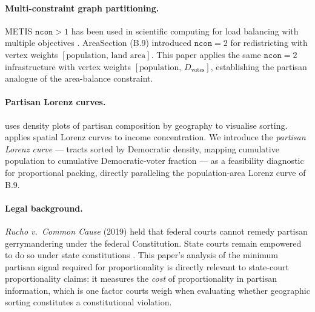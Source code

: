 \paragraph{Multi-constraint graph partitioning.}
METIS $\mathtt{ncon} > 1$ has been used in scientific computing for load
balancing with multiple objectives \citep{karypis1999metis}.
AreaSection (B.9) introduced $\mathtt{ncon}=2$ for redistricting with vertex
weights $[\text{population},\, \text{land area}]$.
This paper applies the same $\mathtt{ncon}=2$ infrastructure with vertex
weights $[\text{population},\, D_{\text{votes}}]$, establishing the partisan
analogue of the area-balance constraint.

\paragraph{Partisan Lorenz curves.}
\citet{rodden2019} uses density plots of partisan composition by geography to
visualise sorting.
\citet{frank2010} applies spatial Lorenz curves to income concentration.
We introduce the \emph{partisan Lorenz curve} --- tracts sorted by Democratic
density, mapping cumulative population to cumulative Democratic-voter fraction ---
as a feasibility diagnostic for proportional packing, directly paralleling the
population-area Lorenz curve of B.9.

\paragraph{Legal background.}
\emph{Rucho v.\ Common Cause} (2019) held that federal courts cannot remedy
partisan gerrymandering under the federal Constitution.
State courts remain empowered to do so under state constitutions
\citep{lwv2018pa, harper2022nc}.
This paper's analysis of the minimum partisan signal required for proportionality
is directly relevant to state-court proportionality claims: it measures the
\emph{cost} of proportionality in partisan information, which is one factor
courts weigh when evaluating whether geographic sorting constitutes a
constitutional violation.

